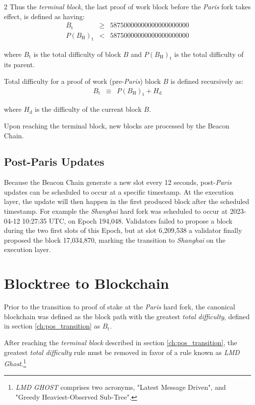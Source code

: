 \documentclass[9pt,oneside]{amsart}
\begin{document}
\begin{multicols}{2}
Thus the \textit{terminal block}, the last proof of work block before the \textit{Paris} fork takes effect, is defined as having:
\begin{eqnarray}
  B_{\mathrm{t}} & \geqslant & 58750000000000000000000 \\
  P(B_{\mathrm{H}})_{\mathrm{t}} & < & 58750000000000000000000
\end{eqnarray}

where $B_{\mathrm{t}}$ is the total difficulty of block $B$ and $P(B_{\mathrm{H}})_{\mathrm{t}}$ is the total difficulty of its parent.

Total difficulty for a proof of work (pre-\textit{Paris}) block $B$ is defined recursively as:
\begin{eqnarray}
B_{\mathrm{t}} & \equiv & P(B_{\mathrm{H}})_{\mathrm{t}} + H_{\mathrm{d}}
\end{eqnarray}

where $H_{\mathrm{d}}$ is the difficulty of the current block $B$.

Upon reaching the terminal block, new blocks are processed by the Beacon Chain.

\subsection{Post-Paris Updates}
Because the Beacon Chain generate a new slot every 12 seconds, post-\textit{Paris} updates can be scheduled to occur at a specific timestamp.
At the execution layer, the update will then happen in the first produced block after the scheduled timestamp.
For example the \textit{Shanghai} hard fork was scheduled to occur at 2023-04-12 10:27:35 UTC, on Epoch 194,048.
Validators failed to propose a block during the two first slots of this Epoch, but at slot 6,209,538 a validator finally proposed the block 17,034,870, marking the transition to \textit{Shanghai} on the execution layer.

\section{Blocktree to Blockchain} \label{ch:blocktree_to_blockchain}

Prior to the transition to proof of stake at the \textit{Paris} hard fork, the canonical blockchain was defined as the block path with the greatest \textit{total difficulty}, defined in section \ref{ch:pos_transition} as $B_{\mathrm{t}}$.

After reaching the \textit{terminal block} described in section \ref{ch:pos_transition}, the greatest \textit{total difficulty} rule must be removed in favor of a rule known as \textit{LMD Ghost}.\footnote{\textit{LMD GHOST} comprises two acronyms, "Latest Message Driven", and "Greedy Heaviest-Observed Sub-Tree".}


\end{multicols}
\end{document}
